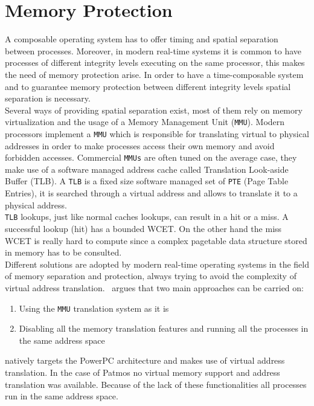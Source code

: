 \section{Memory Protection}\label{sec:address range checks}

A composable operating system has to offer timing and spatial separation between processes. Moreover, in modern real-time systems it is common to have processes of different integrity levels executing on the same processor, this makes the need of memory protection arise. In order to have a time-composable system and to guarantee memory protection between different integrity levels spatial separation is necessary.\\ Several ways of providing spatial separation exist, most of them rely on memory virtualization and the usage of a Memory Management Unit (\texttt{MMU}). Modern processors implement a \texttt{MMU} which is responsible for translating virtual to physical addresses in order to make processes access their own memory and avoid forbidden accesses. Commercial \texttt{MMUs} are often tuned on the average case, they make use of a software managed address cache called Translation Look-aside Buffer (TLB). A \texttt{TLB} is a fixed size software managed set of \texttt{PTE} (Page Table Entries), it is searched through a virtual address and allows to translate it to a physical address.\\

\texttt{TLB} lookups, just like normal caches lookups, can result in a hit or a miss. A successful lookup (hit) has a bounded WCET. On the other hand the miss WCET is really hard to compute since a complex pagetable data structure stored in memory has to be consulted.\\

Different solutions are adopted by modern real-time operating systems in the field of memory separation and protection, always trying to avoid the complexity of virtual address translation.~\cite{10.1109/EMRTS.2001.934028} argues that two main approaches can be carried on: 

\begin{enumerate}
	\item Using the \texttt{MMU} translation system as it is
	\item Disabling all the memory translation features and running all the processes in the same address space
\end{enumerate}

\os natively targets the PowerPC architecture and makes use of virtual address translation. In the case of Patmos no virtual memory support and address translation was available. Because of the lack of these functionalities all processes run in the same address space.

